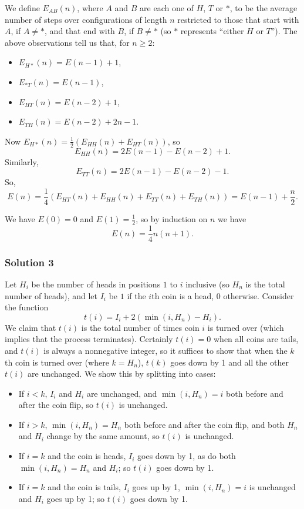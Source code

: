 We define $E_{AB}(n)$, where $A$ and $B$ are each one of $H$, $T$ or $*$, to be the average number of steps over configurations of length $n$ restricted to those that start with $A$, if $A \neq *$, and that end with $B$, if $B \neq *$ (so $*$ represents ``either $H$ or $T$''). The above observations tell us that, for $n \geq 2$:
\begin{itemize}
  \item $E_{H*}(n) = E(n - 1) + 1$,
  \item $E_{*T}(n) = E(n - 1)$,
  \item $E_{HT}(n) = E(n - 2) + 1$,
  \item $E_{TH}(n) = E(n - 2) + 2n - 1$.
\end{itemize}

Now $E_{H*}(n) = \frac{1}{2} (E_{HH}(n) + E_{HT}(n))$, so
\[
E_{HH}(n) = 2E(n - 1) - E(n - 2) + 1.
\]
Similarly,
\[
E_{TT}(n) = 2E(n - 1) - E(n - 2) - 1.
\]
So,
\[
E(n) = \frac{1}{4}(E_{HT}(n) + E_{HH}(n) + E_{TT}(n) + E_{TH}(n)) = E(n - 1) + \frac{n}{2}.
\]

We have $E(0) = 0$ and $E(1) = \frac{1}{2}$, so by induction on $n$ we have
\[
E(n) = \frac{1}{4}n(n + 1).
\]

\subsubsection*{Solution 3}
Let $H_i$ be the number of heads in positions $1$ to $i$ inclusive (so $H_n$ is the total number of heads), and let $I_i$ be $1$ if the $i$th coin is a head, $0$ otherwise. Consider the function
\[
t(i) = I_i + 2(\min(i, H_n) - H_i).
\]
We claim that $t(i)$ is the total number of times coin $i$ is turned over (which implies that the process terminates). Certainly $t(i) = 0$ when all coins are tails, and $t(i)$ is always a nonnegative integer, so it suffices to show that when the $k$th coin is turned over (where $k = H_n$), $t(k)$ goes down by 1 and all the other $t(i)$ are unchanged. We show this by splitting into cases:

\begin{itemize}
    \item If $i < k$, $I_i$ and $H_i$ are unchanged, and $\min(i, H_n) = i$ both before and after the coin flip, so $t(i)$ is unchanged.
    \item If $i > k$, $\min(i, H_n) = H_n$ both before and after the coin flip, and both $H_n$ and $H_i$ change by the same amount, so $t(i)$ is unchanged.
    \item If $i = k$ and the coin is heads, $I_i$ goes down by 1, as do both $\min(i, H_n) = H_n$ and $H_i$; so $t(i)$ goes down by 1.
    \item If $i = k$ and the coin is tails, $I_i$ goes up by 1, $\min(i, H_n) = i$ is unchanged and $H_i$ goes up by 1; so $t(i)$ goes down by 1.
\end{itemize}

